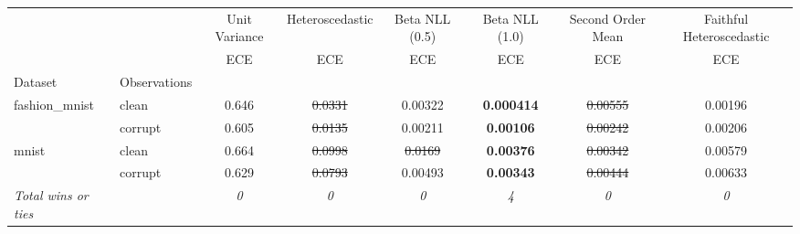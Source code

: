 \begin{tabular}{ll|c|c|c|c|c|c}
\toprule
{} & {} & {Unit Variance} & {Heteroscedastic} & {Beta NLL (0.5)} & {Beta NLL (1.0)} & {Second Order Mean} & {Faithful Heteroscedastic} \\
{} & {} & {ECE} & {ECE} & {ECE} & {ECE} & {ECE} & {ECE} \\
{Dataset} & {Observations} & {} & {} & {} & {} & {} & {} \\
\midrule
\multirow[t]{2}{*}{fashion_mnist} & clean & 0.646 & \sout{0.0331} & 0.00322 & \textbf{0.000414} & \sout{0.00555} & 0.00196 \\
 & corrupt & 0.605 & \sout{0.0135} & 0.00211 & \textbf{0.00106} & \sout{0.00242} & 0.00206 \\
\multirow[t]{2}{*}{mnist} & clean & 0.664 & \sout{0.0998} & \sout{0.0169} & \textbf{0.00376} & \sout{0.00342} & 0.00579 \\
 & corrupt & 0.629 & \sout{0.0793} & 0.00493 & \textbf{0.00343} & \sout{0.00444} & 0.00633 \\
\textit{{Total wins or ties}} &  & \textit{0} & \textit{0} & \textit{0} & \textit{4} & \textit{0} & \textit{0} \\
\bottomrule
\end{tabular}
